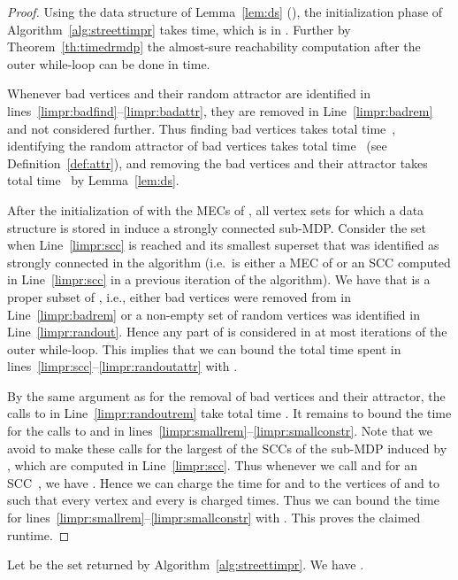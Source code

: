 \documentclass[11pt,letterpaper]{article}
\begin{document}
\begin{proof}
	Using the data structure of Lemma~\ref{lem:ds} (\cite{HenzingerT96}),
	the initialization phase of Algorithm~\ref{alg:streettimpr} takes
	 time, which is in . Further by 
	Theorem~\ref{th:timedrmdp} the almost-sure reachability computation
	after the outer while-loop can be done in  time. 
	
	Whenever bad vertices and their random attractor are identified in 
	lines~\ref{limpr:badfind}--\ref{limpr:badattr}, they are removed in 
	Line~\ref{limpr:badrem} and not considered further. Thus finding bad 
	vertices takes total time~,
	identifying the random attractor of bad vertices takes total time~ (see 
	Definition~\ref{def:attr}), and removing the bad vertices and their attractor 
	takes total time~ by Lemma~\ref{lem:ds}.
	
	After the initialization of  with the MECs of , all vertex sets 
	for which a data structure is stored in  induce a strongly connected sub-MDP.
	Consider the set  when Line~\ref{limpr:scc} is reached and its smallest superset
	 that was identified as strongly connected in the algorithm
	(i.e.\  is either a MEC of  or an SCC computed in Line~\ref{limpr:scc}
	in a previous iteration of the algorithm). We have that  is a proper 
	subset of , i.e., either bad vertices were 
	removed from  in Line~\ref{limpr:badrem} or a non-empty set of random
	vertices was identified in Line~\ref{limpr:randout}. Hence any part of 
	is considered in at most  iterations of the outer while-loop. This implies
	that we can bound the total time spent in 
	lines~\ref{limpr:scc}--\ref{limpr:randoutattr} with .
	
	By the same argument as for the removal of bad vertices and their attractor,
	the calls to  in Line~\ref{limpr:randoutrem} take total time .
	It remains to bound the time for the calls to  and 
	in lines~\ref{limpr:smallrem}--\ref{limpr:smallconstr}. Note that we avoid to
	make these calls for the largest of the SCCs of the sub-MDP induced by ,
	which are computed in Line~\ref{limpr:scc}.
	Thus whenever we call  and  for an SCC~, we have 
	. Hence 
	we can charge the time for  and  to the vertices of 
	and to  such that every vertex  and every  is 
	charged  times. Thus we can bound the time for 
	lines~\ref{limpr:smallrem}--\ref{limpr:smallconstr} with .
	This proves the claimed runtime.
\end{proof}

\begin{proposition}\label{prop:streettimprsound}
	Let  be the set returned by Algorithm~\ref{alg:streettimpr}.
	We have .
\end{proposition}
\end{document}
